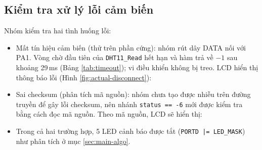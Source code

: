 \subsection{Kiểm tra xử lý lỗi cảm biến}
Nhóm kiểm tra hai tình huống lỗi:
\begin{itemize}[leftmargin=1.2cm, topsep=0pt, itemsep=0.5pt, parsep=0pt]
    \item Mất tín hiệu cảm biến (thử trên phần cứng): nhóm rút dây DATA nối với PA1. Vòng chờ đầu tiên của \texttt{DHT11\_Read} hết hạn và hàm trả về $-1$ sau khoảng 29\,ms (Bảng \ref{tab:timeout}); vi điều khiển không bị treo. LCD hiển thị thông báo lỗi (Hình \ref{fig:actual-disconnect}):
    \item Sai checksum (phân tích mã nguồn): nhóm chưa tạo được nhiễu trên đường truyền để gây lỗi checksum, nên nhánh \texttt{status == -6} mới được kiểm tra bằng cách đọc mã nguồn. Theo mã nguồn, LCD sẽ hiển thị:
    \item Trong cả hai trường hợp, 5 LED cảnh báo được tắt (\texttt{PORTD |= LED\_MASK}) như phân tích ở mục \ref{sec:main-algo}.
\end{itemize}

